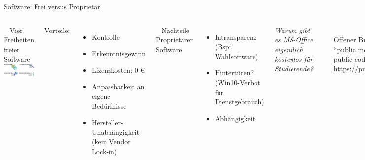 \documentclass[t]{beamer}
\begin{document}
\begin{frame}[label=wb]{\color{fg}Software: Frei versus Proprietär}

\begin{columns}


~
Vier Freiheiten freier Software\\[4mm]
\includegraphics[width=40mm]{img-src/vier-freiheiten}
\pause

Vorteile:
\begin{itemize}
\item Kontrolle
\item Erkenntnisgewinn
\item Lizenzkosten: 0 €
\item Anpassbarkeit an eigene Bedürfnisse
\item Hersteller-Unabhängigkeit\\[-2mm] {\tiny (kein Vendor Lock-in)}

\end{itemize}


~ 
Nachteile Proprietärer Software
\begin{itemize}
 \item Intransparenz {\tiny (Bsp: Wahlsoftware)}
 \item Hintertüren? {\tiny (Win10-Verbot für Dienstgebrauch)}
 \item Abhängigkeit
\end{itemize}
 \pause
 \bigskip
 
 
 \textit{Warum gibt es MS-Office eigentlich { kostenlos} für Studierende?}
 
 \pause
 \pause
 \medskip
 \rule{\textwidth}{1pt}\\[2mm]
 Offener Brief:\\
 
 "`public money $\Rightarrow$ public code"'\\[2mm]
 
 \url{https://publiccode.eu}


\end{columns}



\end{frame}
\end{document}
